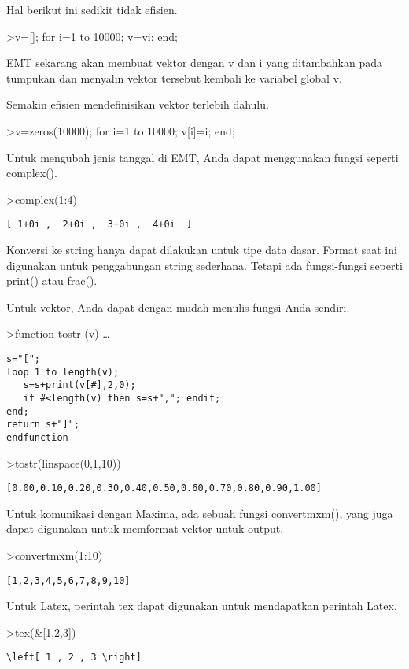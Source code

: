 \documentclass[
]{book}
\begin{document}
Hal berikut ini sedikit tidak efisien.

\textgreater v={[}{]}; for i=1 to 10000; v=v\textbar i; end;

EMT sekarang akan membuat vektor dengan v dan i yang ditambahkan pada tumpukan dan menyalin vektor tersebut kembali ke variabel global v.

Semakin efisien mendefinisikan vektor terlebih dahulu.

\textgreater v=zeros(10000); for i=1 to 10000; v{[}i{]}=i; end;

Untuk mengubah jenis tanggal di EMT, Anda dapat menggunakan fungsi seperti complex().

\textgreater complex(1:4)

\begin{verbatim}
[ 1+0i ,  2+0i ,  3+0i ,  4+0i  ]
\end{verbatim}

Konversi ke string hanya dapat dilakukan untuk tipe data dasar. Format saat ini digunakan untuk penggabungan string sederhana. Tetapi ada fungsi-fungsi seperti print() atau frac().

Untuk vektor, Anda dapat dengan mudah menulis fungsi Anda sendiri.

\textgreater function tostr (v) \ldots{}

\begin{verbatim}
s="[";
loop 1 to length(v);
   s=s+print(v[#],2,0);
   if #<length(v) then s=s+","; endif;
end;
return s+"]";
endfunction
\end{verbatim}

\textgreater tostr(linspace(0,1,10))

\begin{verbatim}
[0.00,0.10,0.20,0.30,0.40,0.50,0.60,0.70,0.80,0.90,1.00]
\end{verbatim}

Untuk komunikasi dengan Maxima, ada sebuah fungsi convertmxm(), yang juga dapat digunakan untuk memformat vektor untuk output.

\textgreater convertmxm(1:10)

\begin{verbatim}
[1,2,3,4,5,6,7,8,9,10]
\end{verbatim}

Untuk Latex, perintah tex dapat digunakan untuk mendapatkan perintah Latex.

\textgreater tex(\&{[}1,2,3{]})

\begin{verbatim}
\left[ 1 , 2 , 3 \right] 
\end{verbatim}
\end{document}
